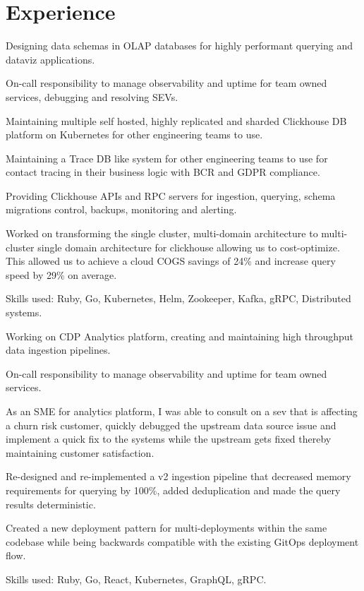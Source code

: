 \section{Experience}

    \begin{tightemize}
      \item Designing data schemas in OLAP databases for highly performant querying and dataviz applications.
      \item On-call responsibility to manage observability and uptime for team owned services, debugging and resolving SEVs.
      \item Maintaining multiple self hosted, highly replicated and sharded Clickhouse DB platform on Kubernetes for other engineering teams to use.
      \item Maintaining a Trace DB like system for other engineering teams to use for contact tracing in their business logic with BCR and GDPR compliance.
      \item Providing Clickhouse APIs and RPC servers for ingestion, querying, schema migrations control, backups, monitoring and alerting.
      \item Worked on transforming the single cluster, multi-domain architecture to multi-cluster single domain architecture for clickhouse allowing us to cost-optimize. This allowed us to achieve a cloud COGS savings of 24\% and increase query speed by 29\% on average.
      \item Skills used: Ruby, Go, Kubernetes, Helm, Zookeeper, Kafka, gRPC, Distributed systems.
    \end{tightemize}
    \sectionsep

    \begin{tightemize}
      \item Working on CDP Analytics platform, creating and maintaining high throughput data ingestion pipelines.
      \item On-call responsibility to manage observability and uptime for team owned services.
      \item As an SME for analytics platform, I was able to consult on a sev that is affecting a churn risk customer, quickly debugged the upstream data source issue and implement a quick fix to the systems while the upstream gets fixed thereby maintaining customer satisfaction.
      \item Re-designed and re-implemented a v2 ingestion pipeline that decreased memory requirements for querying by 100\%, added deduplication and made the query results deterministic.
      \item Created a new deployment pattern for multi-deployments within the same codebase while being backwards compatible with the existing GitOps deployment flow.
      \item Skills used: Ruby, Go, React, Kubernetes, GraphQL, gRPC.
    \end{tightemize} 
    \sectionsep

